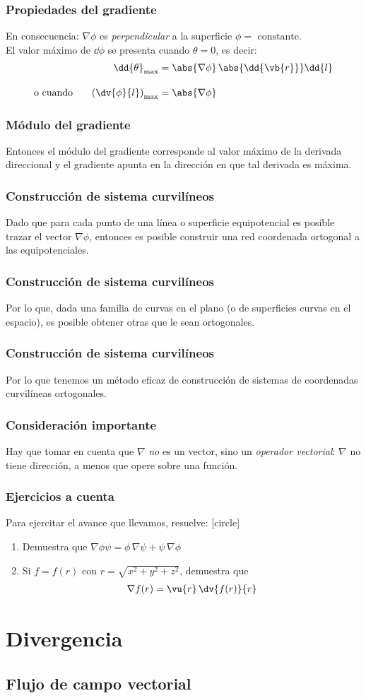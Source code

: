 \begin{frame}
\frametitle{Propiedades del gradiente}
En consecuencia: $\nabla{\phi}$ es \emph{perpendicular} a la superficie $\phi = \mbox{ constante}$.
\\
\bigskip
\pause
El valor máximo de $\dd{\phi}$ se presenta cuando $\theta = 0$, es decir:
\begin{align*}
\dd{\theta}_{\max} &= \abs{\nabla{\phi}} \, \abs{\dd{\vb{r}}} \dd{l} \\[1em]
\mbox{o cuando } \hspace{0.5cm} \left( \dv{\phi}{l} \right)_{\max} &= \abs{\nabla{\phi}}
\end{align*}
\end{frame}
\begin{frame}
\frametitle{Módulo del gradiente}
Entonces el módulo del gradiente corresponde al valor máximo de la derivada direccional y el gradiente apunta en la dirección en que tal derivada es máxima.
\end{frame}
\begin{frame}
\frametitle{Construcción de sistema curvilíneos}
Dado que para cada punto de una línea o superficie equipotencial es posible trazar el vector $\nabla{\phi}$, entonces es posible construir una red coordenada ortogonal a las equipotenciales.
\end{frame}
\begin{frame}
\frametitle{Construcción de sistema curvilíneos}
Por lo que, dada una familia de curvas en el plano (o de superficies curvas en el espacio), es posible obtener otras que le sean ortogonales.
\end{frame}
\begin{frame}
\frametitle{Construcción de sistema curvilíneos}
Por lo que tenemos un método eficaz de construcción de sistemas de coordenadas curvilíneas ortogonales.
\end{frame}
\begin{frame}
\frametitle{Consideración importante}
Hay que tomar en cuenta que $\nabla$ \emph{no} es un vector, sino un \emph{operador vectorial}: $\nabla$ no tiene dirección, a menos que opere sobre una función.
\end{frame}
\begin{frame}
\frametitle{Ejercicios a cuenta}
Para ejercitar el avance que llevamos, resuelve:
[circle]
\begin{enumerate}
\item Demuestra que $\nabla{\phi \psi} = \phi \, \nabla{\psi} + \psi \, \nabla{\phi}$
\item Si $f = f(r)$ con $r = \sqrt{x^{2} + y^{2}+ z^{2}}$, demuestra que
\begin{align*}
\nabla{f(r)} = \vu{r} \, \dv{f(r)}{r}
\end{align*}
\end{enumerate}
\end{frame}
\section{Divergencia}
\subsection{Flujo de campo vectorial}
